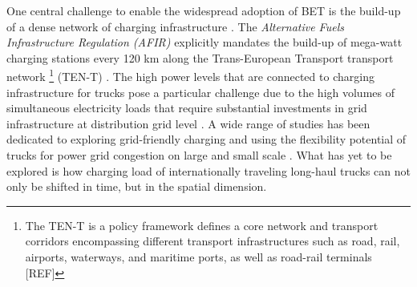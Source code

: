 \documentclass[preprint,10pt,review, authoryear]{elsarticle}
\begin{document}

        One central challenge to enable the widespread adoption of BET is the build-up of a dense network of charging infrastructure \citep{MULLER2025104455}. The \textit{Alternative Fuels Infrastructure Regulation (AFIR)} explicitly mandates the build-up of mega-watt charging stations every 120 km along the Trans-European Transport transport network \footnote{The TEN-T is a policy framework defines a core network and transport corridors encompassing different transport infrastructures such as road, rail, airports, waterways, and maritime ports, as well as road-rail terminals [REF]} (TEN-T) \citep{EU_AFIR2023}. The high power levels that are connected to charging infrastructure for trucks pose a particular challenge  due to the high volumes of simultaneous electricity loads that require substantial investments in grid infrastructure at distribution grid level \citep{ZHAO2025309}. A wide range of studies has been dedicated to exploring grid-friendly charging and using the flexibility potential of trucks for power grid congestion on large and small scale \citep{GOLAB2025134385, KARMALI2024101397}. What has yet to be explored is how charging load of internationally traveling long-haul trucks can not only be shifted in time, but in the spatial dimension.
\end{document}
